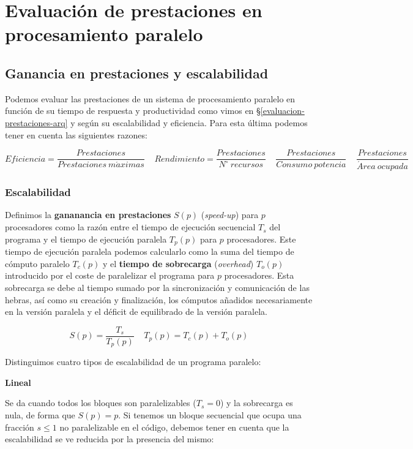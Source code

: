 \section{Evaluación de prestaciones en procesamiento paralelo}\label{evaluacion-prestaciones}

\subsection{Ganancia en prestaciones y escalabilidad}\label{ganancia-prestaciones-escalabilidad}

Podemos evaluar las prestaciones de un sistema de procesamiento paralelo en función de su tiempo de respuesta y productividad como vimos en \S\ref{evaluacion-prestaciones-arq} y según su escalabilidad y eficiencia.
Para esta última podemos tener en cuenta las siguientes razones:

\[Eficiencia=\frac{Prestaciones}{Prestaciones\ m\acute{a}ximas}\ \ \ \ \ Rendimiento=\frac{Prestaciones}{N^{\circ}\ recursos}\ \ \ \ \ \frac{Prestaciones}{Consumo\ potencia}\ \ \ \ \ \frac{Prestaciones}{\acute{A}rea\ ocupada}\]

\subsubsection{Escalabilidad}

Definimos la \textbf{gananancia en prestaciones} $S(p)$ (\textit{speed-up}) para $p$ procesadores como la razón entre el tiempo de ejecución secuencial $T_s$ del programa y el tiempo de ejecución paralela $T_p(p)$ para $p$ procesadores.
Este tiempo de ejecución paralela podemos calcularlo como la suma del tiempo de cómputo paralelo $T_c(p)$ y el \textbf{tiempo de sobrecarga} (\textit{overhead}) $T_o(p)$ introducido por el coste de paralelizar el programa para $p$ procesadores.
Esta sobrecarga se debe al tiempo sumado por la sincronización y comunicación de las hebras, así como su creación y finalización, los cómputos añadidos necesariamente en la versión paralela y el déficit de equilibrado de la versión paralela.

\[S(p)=\frac{T_s}{T_p(p)}\ \ \ \ \ T_p(p)=T_c(p)+T_o(p)\]

Distinguimos cuatro tipos de escalabilidad de un programa paralelo:

\textbf{Lineal}

Se da cuando todos los bloques son paralelizables ($T_s=0$) y la sobrecarga es nula, de forma que $S(p)=p$.
Si tenemos un bloque secuencial que ocupa una fracción $s\leq1$ no paralelizable en el código, debemos tener en cuenta que la escalabilidad se ve reducida por la presencia del mismo:

